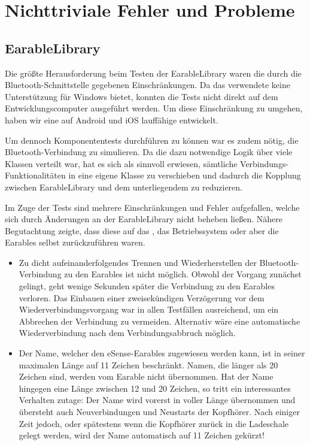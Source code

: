 \documentclass[../validierung.tex]{subfiles}
\begin{document}
\section{Nichttriviale Fehler und Probleme}
	\subsection{EarableLibrary}
		Die größte Herausforderung beim Testen der EarableLibrary waren die durch die Bluetooth-Schnittstelle gegebenen Einschränkungen.
		Da das verwendete  keine Unterstützung für Windows bietet, konnten die Tests nicht direkt auf dem
		Entwicklungscomputer ausgeführt werden.
		Um diese Einschränkung zu umgehen, haben wir eine auf Android und iOS lauffähige  entwickelt.
		
		Um dennoch Komponententests durchführen zu können war es zudem nötig, die Bluetooth-Verbindung zu simulieren.
		Da die dazu notwendige Logik über viele Klassen verteilt war, hat es sich als sinnvoll erwiesen, sämtliche Verbindungs-Funktionalitäten in eine 
		eigene Klasse  zu verschieben und dadurch die Kopplung zwischen EarableLibrary und dem unterliegendem 
		 zu reduzieren.
		
		Im Zuge der Tests sind mehrere Einschränkungen und Fehler aufgefallen, welche sich durch Änderungen an der EarableLibrary nicht beheben ließen.
		Nähere Begutachtung zeigte, dass diese auf das , das Betriebssystem oder aber die Earables selbst zurückzuführen waren.
		
		\begin{itemize}
			\item Zu dicht aufeinanderfolgendes Trennen und Wiederherstellen der Bluetooth-Verbindung zu den Earables ist nicht möglich. 
			Obwohl der Vorgang
			zunächst gelingt, geht wenige Sekunden später die Verbindung zu den Earables verloren. Das Einbauen einer zweisekündigen Verzögerung vor dem
			Wiederverbindungsvorgang war in allen Testfällen ausreichend, um ein Abbrechen der Verbindung zu vermeiden.
			Alternativ wäre eine automatische Wiederverbindung nach dem Verbindungsabbruch möglich.
			\item Der Name, welcher den eSense-Earables zugewiesen werden kann, ist in seiner maximalen Länge auf 11 Zeichen beschränkt. Namen, die länger
			als 20 Zeichen sind, werden vom Earable nicht übernommen. Hat der Name hingegen eine Länge zwischen 12 und 20 Zeichen, so tritt ein 
			interessantes Verhalten zutage: Der Name wird vorerst in voller Länge übernommen und übersteht auch Neuverbindungen und Neustarts der 
			Kopfhörer. Nach einiger Zeit jedoch, oder spätestens wenn die Kopfhörer zurück in die Ladeschale gelegt werden, wird der Name automatisch auf 
			11 Zeichen gekürzt! 		
		\end{itemize}
\end{document}
